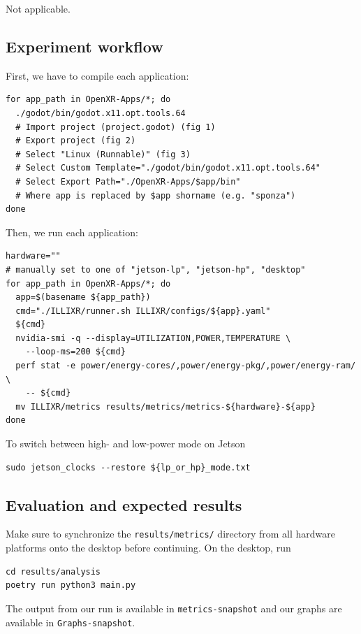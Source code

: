 \documentclass{sigplanconf}
\begin{document}
Not applicable.

\subsection{Experiment workflow}

First, we have to compile each application:

{
\footnotesize
\begin{verbatim}
for app_path in OpenXR-Apps/*; do
  ./godot/bin/godot.x11.opt.tools.64
  # Import project (project.godot) (fig 1)
  # Export project (fig 2)
  # Select "Linux (Runnable)" (fig 3)
  # Select Custom Template="./godot/bin/godot.x11.opt.tools.64"
  # Select Export Path="./OpenXR-Apps/$app/bin"
  # Where app is replaced by $app shorname (e.g. "sponza")
done
\end{verbatim}
}

Then, we run each application:

{\scriptsize
\begin{verbatim}
hardware=""
# manually set to one of "jetson-lp", "jetson-hp", "desktop"
for app_path in OpenXR-Apps/*; do
  app=$(basename ${app_path})
  cmd="./ILLIXR/runner.sh ILLIXR/configs/${app}.yaml"
  ${cmd}
  nvidia-smi -q --display=UTILIZATION,POWER,TEMPERATURE \
    --loop-ms=200 ${cmd}
  perf stat -e power/energy-cores/,power/energy-pkg/,power/energy-ram/ \
    -- ${cmd}
  mv ILLIXR/metrics results/metrics/metrics-${hardware}-${app}
done
\end{verbatim}
}

To switch between high- and low-power mode on Jetson

{\small
\begin{verbatim}
sudo jetson_clocks --restore ${lp_or_hp}_mode.txt
\end{verbatim}
}

\subsection{Evaluation and expected results}

Make sure to synchronize the \texttt{results/metrics/} directory from all hardware platforms onto the desktop before continuing. On the desktop, run

{\footnotesize
\begin{verbatim}
cd results/analysis
poetry run python3 main.py
\end{verbatim}
}

The output from our run is available in \texttt{metrics-snapshot} and our graphs are available in \texttt{Graphs-snapshot}.
\end{document}
